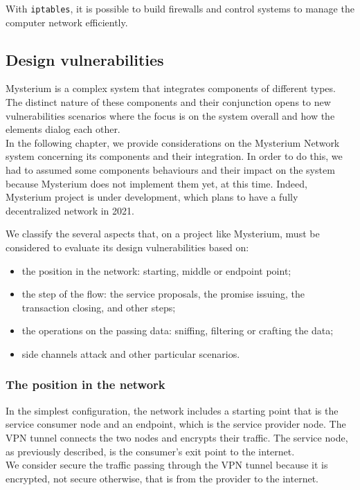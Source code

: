 \documentclass[12pt]{article}
\begin{document}
	With \lstinline{iptables}, it is possible to build firewalls and control systems to manage the computer network efficiently.


	\subsection{Design vulnerabilities}

	Mysterium is a complex system that integrates components of different types. The distinct nature of these components and their conjunction opens to new vulnerabilities scenarios where the focus is on the system overall and how the elements dialog each other.\\
	In the following chapter, we provide considerations on the Mysterium Network system concerning its components and their integration. In order to do this, we had to assumed some components behaviours and their impact on the system because Mysterium does not implement them yet, at this time. Indeed, Mysterium project is under development, which plans to have a fully decentralized network in 2021. 

	We classify the several aspects that, on a project like Mysterium, must be considered to evaluate its design vulnerabilities based on:
	\begin{itemize}
		\item the position in the network: starting, middle or endpoint point;
		\item the step of the flow: the service proposals, the promise issuing, the transaction closing, and other steps;
		\item the operations on the passing data: sniffing, filtering or crafting the data;
		\item side channels attack and other particular scenarios.
	\end{itemize}
	
	\subsubsection{The position in the network}

	In the simplest configuration, the network includes a starting point that is the service consumer node and an endpoint, which is the service provider node. The VPN tunnel connects the two nodes and encrypts their traffic. The service node, as previously described, is the consumer's exit point to the internet.\\
	We consider secure the traffic passing through the VPN tunnel because it is encrypted, not secure otherwise, that is from the provider to the internet.\\
\end{document}
